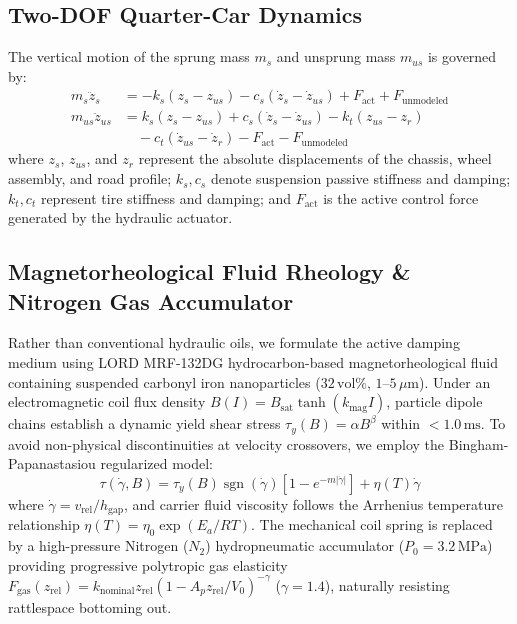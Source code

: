 \documentclass[journal,twocolumn,letterpaper]{IEEEtran}
\begin{document}
\subsection{Two-DOF Quarter-Car Dynamics}
The vertical motion of the sprung mass $m_s$ and unsprung mass $m_{us}$ is governed by:
\begin{align}
m_s \ddot{z}_s &= -k_s(z_s - z_{us}) - c_s(\dot{z}_s - \dot{z}_{us}) + F_{\text{act}} + F_{\text{unmodeled}} \label{eq:sprung} \\
m_{us} \ddot{z}_{us} &= k_s(z_s - z_{us}) + c_s(\dot{z}_s - \dot{z}_{us}) - k_t(z_{us} - z_r) \nonumber \\
&\quad - c_t(\dot{z}_{us} - \dot{z}_r) - F_{\text{act}} - F_{\text{unmodeled}} \label{eq:unsprung}
\end{align}
where $z_s$, $z_{us}$, and $z_r$ represent the absolute displacements of the chassis, wheel assembly, and road profile; $k_s, c_s$ denote suspension passive stiffness and damping; $k_t, c_t$ represent tire stiffness and damping; and $F_{\text{act}}$ is the active control force generated by the hydraulic actuator.

\subsection{Magnetorheological Fluid Rheology \& Nitrogen Gas Accumulator}
Rather than conventional hydraulic oils, we formulate the active damping medium using LORD MRF-132DG hydrocarbon-based magnetorheological fluid containing suspended carbonyl iron nanoparticles ($32\,\text{vol}\%$, $1\text{--}5\,\mu\text{m}$). Under an electromagnetic coil flux density $B(I) = B_{\text{sat}} \tanh(k_{\text{mag}} I)$, particle dipole chains establish a dynamic yield shear stress $\tau_y(B) = \alpha B^\beta$ within $<1.0\,\text{ms}$. To avoid non-physical discontinuities at velocity crossovers, we employ the Bingham-Papanastasiou regularized model:
\begin{equation}
\tau(\dot{\gamma}, B) = \tau_y(B) \operatorname{sgn}(\dot{\gamma}) \left[1 - e^{-m |\dot{\gamma}|}\right] + \eta(T) \dot{\gamma}
\end{equation}
where $\dot{\gamma} = v_{\text{rel}} / h_{\text{gap}}$, and carrier fluid viscosity follows the Arrhenius temperature relationship $\eta(T) = \eta_0 \exp(E_a / RT)$. The mechanical coil spring is replaced by a high-pressure Nitrogen ($N_2$) hydropneumatic accumulator ($P_0 = 3.2\,\text{MPa}$) providing progressive polytropic gas elasticity $F_{\text{gas}}(z_{\text{rel}}) = k_{\text{nominal}} z_{\text{rel}} (1 - A_p z_{\text{rel}} / V_0)^{-\gamma}$ ($\gamma = 1.4$), naturally resisting rattlespace bottoming out.
\end{document}

